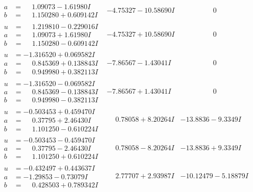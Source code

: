 \documentclass[1p]{elsarticle_modified}
\theoremstyle{definition}
\begin{document}
$$\begin{array}{c|c|c}
\begin{aligned}
a &= \phantom{-}1.09073 - 1.61980 I \\
b &= \phantom{-}1.150280 + 0.609142 I\end{aligned}
 & -4.75327 - 10.58690 I & \phantom{-0.000000 } 0 \\ \hline\begin{aligned}
u &= \phantom{-}1.219810 - 0.229016 I \\
a &= \phantom{-}1.09073 + 1.61980 I \\
b &= \phantom{-}1.150280 - 0.609142 I\end{aligned}
 & -4.75327 + 10.58690 I & \phantom{-0.000000 } 0 \\ \hline\begin{aligned}
u &= -1.316520 + 0.069582 I \\
a &= \phantom{-}0.845369 + 0.138843 I \\
b &= \phantom{-}0.949980 + 0.382113 I\end{aligned}
 & -7.86567 - 1.43041 I & \phantom{-0.000000 } 0 \\ \hline\begin{aligned}
u &= -1.316520 - 0.069582 I \\
a &= \phantom{-}0.845369 - 0.138843 I \\
b &= \phantom{-}0.949980 - 0.382113 I\end{aligned}
 & -7.86567 + 1.43041 I & \phantom{-0.000000 } 0 \\ \hline\begin{aligned}
u &= -0.503453 + 0.459470 I \\
a &= \phantom{-}0.37795 + 2.46430 I \\
b &= \phantom{-}1.101250 - 0.610224 I\end{aligned}
 & \phantom{-}0.78058 + 8.20264 I & -13.8836 - 9.3349 I \\ \hline\begin{aligned}
u &= -0.503453 - 0.459470 I \\
a &= \phantom{-}0.37795 - 2.46430 I \\
b &= \phantom{-}1.101250 + 0.610224 I\end{aligned}
 & \phantom{-}0.78058 - 8.20264 I & -13.8836 + 9.3349 I \\ \hline\begin{aligned}
u &= -0.432497 + 0.443637 I \\
a &= -1.29853 - 0.73079 I \\
b &= \phantom{-}0.428503 + 0.789342 I\end{aligned}
 & \phantom{-}2.77707 + 2.93987 I & -10.12479 - 5.18879 I \\ \hline\begin{aligned}

\end{aligned}
\end{array}$$
\end{document}
